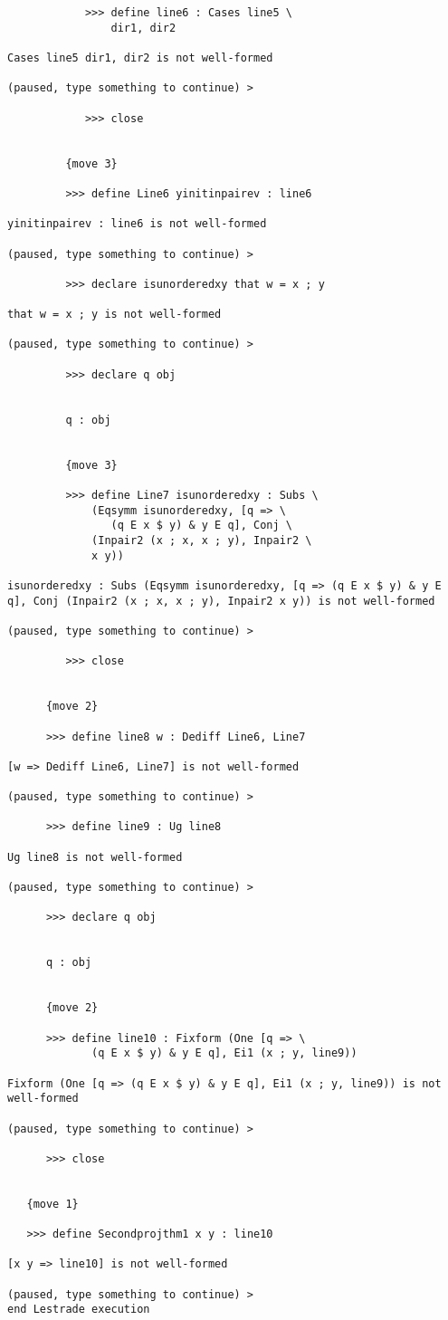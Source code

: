 \documentclass[12pt]{article}
\begin{document}
\begin{verbatim}
            >>> define line6 : Cases line5 \
                dir1, dir2

Cases line5 dir1, dir2 is not well-formed

(paused, type something to continue) >

            >>> close


         {move 3}

         >>> define Line6 yinitinpairev : line6

yinitinpairev : line6 is not well-formed

(paused, type something to continue) >

         >>> declare isunorderedxy that w = x ; y

that w = x ; y is not well-formed

(paused, type something to continue) >

         >>> declare q obj


         q : obj


         {move 3}

         >>> define Line7 isunorderedxy : Subs \
             (Eqsymm isunorderedxy, [q => \
                (q E x $ y) & y E q], Conj \
             (Inpair2 (x ; x, x ; y), Inpair2 \
             x y))

isunorderedxy : Subs (Eqsymm isunorderedxy, [q => (q E x $ y) & y E q], Conj (Inpair2 (x ; x, x ; y), Inpair2 x y)) is not well-formed

(paused, type something to continue) >

         >>> close


      {move 2}

      >>> define line8 w : Dediff Line6, Line7

[w => Dediff Line6, Line7] is not well-formed

(paused, type something to continue) >

      >>> define line9 : Ug line8

Ug line8 is not well-formed

(paused, type something to continue) >

      >>> declare q obj


      q : obj


      {move 2}

      >>> define line10 : Fixform (One [q => \
             (q E x $ y) & y E q], Ei1 (x ; y, line9))

Fixform (One [q => (q E x $ y) & y E q], Ei1 (x ; y, line9)) is not well-formed

(paused, type something to continue) >

      >>> close


   {move 1}

   >>> define Secondprojthm1 x y : line10

[x y => line10] is not well-formed

(paused, type something to continue) >
end Lestrade execution
\end{verbatim}
\end{document}
